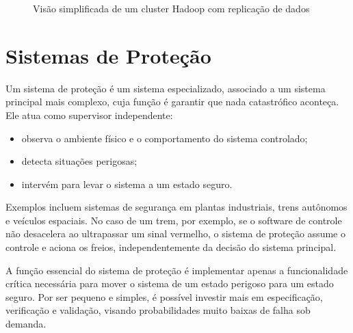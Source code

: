 \documentclass[12pt,a4paper]{report}
\begin{document}
\begin{figure}[h]
    \centering
    \caption{Visão simplificada de um cluster Hadoop com replicação de dados}
    \label{fig:hadoop-simples}
\end{figure}

\section{Sistemas de Proteção}

Um sistema de proteção é um sistema especializado, associado a um sistema
principal mais complexo, cuja função é garantir que nada catastrófico
aconteça. Ele atua como supervisor independente:
\begin{itemize}[nosep]
    \item observa o ambiente físico e o comportamento do sistema controlado;
    \item detecta situações perigosas;
    \item intervém para levar o sistema a um estado seguro.
\end{itemize}

Exemplos incluem sistemas de segurança em plantas industriais, trens
autônomos e veículos espaciais. No caso de um trem, por exemplo, se o
software de controle não desacelera ao ultrapassar um sinal vermelho, o
sistema de proteção assume o controle e aciona os freios, independentemente
da decisão do sistema principal.

A função essencial do sistema de proteção é implementar apenas a
funcionalidade crítica necessária para mover o sistema de um estado perigoso
para um estado seguro. Por ser pequeno e simples, é possível investir mais
em especificação, verificação e validação, visando probabilidades muito
baixas de falha sob demanda.
\end{document}

